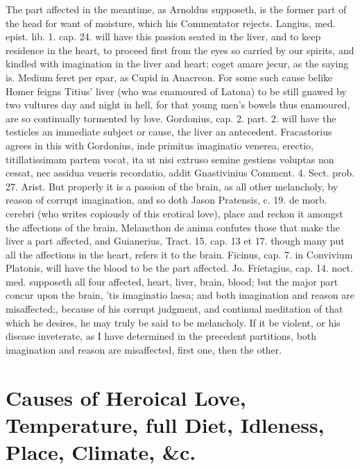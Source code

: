 The part affected in the meantime, as Arnoldus supposeth, is the
former part of the head for want of moisture, which his Commentator
rejects. Langius, med. epist. lib. 1. cap. 24. will have this passion
seated in the liver, and to keep residence in the heart, to
proceed first from the eyes so carried by our spirits, and kindled with
imagination in the liver and heart; coget amare jecur, as the saying
is. Medium feret per epar, as Cupid in Anacreon. For some such cause
belike  Homer feigns Titius' liver (who was enamoured of Latona)
to be still gnawed by two vultures day and night in hell, for
that young men's bowels thus enamoured, are so continually tormented by
love. Gordonius, cap. 2. part. 2. will have the testicles an
immediate subject or cause, the liver an antecedent. Fracastorius
agrees in this with Gordonius, inde primitus imaginatio venerea,
erectio, \etc{} titillatissimam partem vocat, ita ut nisi extruso semine
gestiens voluptas non cessat, nec assidua veneris recordatio, addit
Gnastivinius Comment. 4. Sect. prob. 27. Arist. But properly it
is a passion of the brain, as all other melancholy, by reason of
corrupt imagination, and so doth Jason Pratensis, c. 19. de morb.
cerebri (who writes copiously of this erotical love), place and reckon
it amongst the affections of the brain. Melancthon de anima
confutes those that make the liver a part affected, and Guianerius,
Tract. 15. cap. 13 et 17. though many put all the affections in the
heart, refers it to the brain. Ficinus, cap. 7. in Convivium Platonis,
will have the blood to be the part affected. Jo. Frietagius, cap. 14.
noct. med. supposeth all four affected, heart, liver, brain, blood; but
the major part concur upon the brain, 'tis imaginatio laesa; and
both imagination and reason are misaffected;, because of his corrupt
judgment, and continual meditation of that which he desires, he may
truly be said to be melancholy. If it be violent, or his disease
inveterate, as I have determined in the precedent partitions, both
imagination and reason are misaffected, first one, then the other.


\section[Causes of Heroical Love]{Causes of Heroical Love, Temperature, full Diet, Idleness, Place, Climate, \&c.}


